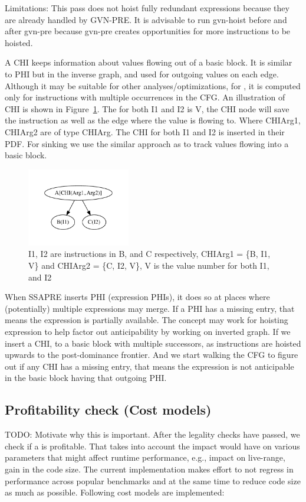 \documentclass[sigplan,10pt,review,anonymous]{acmart}\settopmatter{printfolios=true,printccs=false,printacmref=false}
\begin{document}
Limitations: This pass does not hoist fully redundant expressions because they
are already handled by GVN-PRE. It is advisable to run gvn-hoist before and
after gvn-pre because gvn-pre creates opportunities for more instructions to be
hoisted.


A CHI keeps information about values flowing out of a basic block.  It is
similar to PHI but in the inverse graph, and used for outgoing values on each
edge. Although it may be suitable for other analyses/optimizations, for \GCM{},
it is computed only for instructions with multiple occurrences in the CFG. An
illustration of CHI is shown in Figure~\ref{fig:chi-intro}. The \GVN{} for both
I1 and I2 is V, the CHI node will save the instruction as well as the edge where
the value is flowing to.  Where CHIArg1, CHIArg2 are of type CHIArg. The CHI for
both I1 and I2 is inserted in their PDF. For sinking we use the similar approach
as \cite{ssapre} to track values flowing into a basic block.


\begin{figure}
  \includegraphics[width=0.4\textwidth]{chi-example.pdf}
  \vspace*{-1.0cm}
\caption{I1, I2 are instructions in B, and C respectively, CHIArg1 = \{B, I1,
  V\} and CHIArg2 = \{C, I2, V\}, V is the value number for both I1, and I2}
\label{fig:chi-intro}
\end{figure}


When SSAPRE inserts PHI (expression PHIs), it does so at places where
(potentially) multiple expressions may merge. If a PHI has a missing entry, that
means the expression is partially available.  The concept may work for hoisting
expression to help factor out anticipability by working on inverted graph. If we
insert a CHI, to a basic block with multiple successors, as instructions are
hoisted upwards to the post-dominance frontier.  And we start walking the CFG to
figure out if any CHI has a missing entry, that means the expression is not
anticipable in the basic block having that outgoing PHI.

\subsection{Profitability check (Cost models)}
\label{subsec:cost-models}
TODO: Motivate why this is important.
After the legality checks have passed, we check if a \gcm{} is profitable.  That
takes into account the impact \gcm{} would have on various parameters that might
affect runtime performance, e.g., impact on live-range, gain in the code
size. The current implementation makes effort to not regress in performance
across popular benchmarks and at the same time to reduce code size as much as
possible. Following cost models are implemented:
\end{document}
